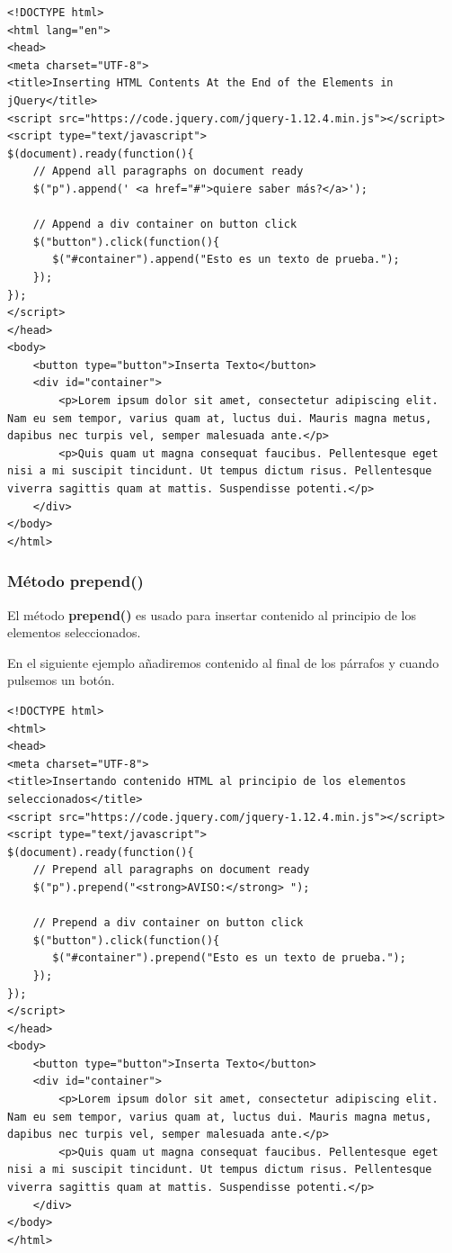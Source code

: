\documentclass[11pt]{article}
\begin{document}
\begin{verbatim}
<!DOCTYPE html>
<html lang="en">
<head>
<meta charset="UTF-8">
<title>Inserting HTML Contents At the End of the Elements in jQuery</title>
<script src="https://code.jquery.com/jquery-1.12.4.min.js"></script>
<script type="text/javascript">
$(document).ready(function(){
    // Append all paragraphs on document ready
    $("p").append(' <a href="#">quiere saber más?</a>');

    // Append a div container on button click
    $("button").click(function(){
       $("#container").append("Esto es un texto de prueba.");
    });
});
</script>
</head>
<body>
    <button type="button">Inserta Texto</button>
    <div id="container">
        <p>Lorem ipsum dolor sit amet, consectetur adipiscing elit. Nam eu sem tempor, varius quam at, luctus dui. Mauris magna metus, dapibus nec turpis vel, semper malesuada ante.</p>
        <p>Quis quam ut magna consequat faucibus. Pellentesque eget nisi a mi suscipit tincidunt. Ut tempus dictum risus. Pellentesque viverra sagittis quam at mattis. Suspendisse potenti.</p>
    </div>
</body>
</html>                                		
\end{verbatim}

\subsubsection*{Método prepend()}
\label{sec:org03af09e}

El método \textbf{prepend()} es usado para insertar contenido al principio de los elementos seleccionados.

En el siguiente ejemplo añadiremos contenido al final de los párrafos y cuando pulsemos un botón.

\begin{verbatim}
<!DOCTYPE html>
<html>
<head>
<meta charset="UTF-8">
<title>Insertando contenido HTML al principio de los elementos seleccionados</title>
<script src="https://code.jquery.com/jquery-1.12.4.min.js"></script>
<script type="text/javascript">
$(document).ready(function(){
    // Prepend all paragraphs on document ready
    $("p").prepend("<strong>AVISO:</strong> ");

    // Prepend a div container on button click
    $("button").click(function(){
       $("#container").prepend("Esto es un texto de prueba.");
    });
});
</script>
</head>
<body>
    <button type="button">Inserta Texto</button>
    <div id="container">
        <p>Lorem ipsum dolor sit amet, consectetur adipiscing elit. Nam eu sem tempor, varius quam at, luctus dui. Mauris magna metus, dapibus nec turpis vel, semper malesuada ante.</p>
        <p>Quis quam ut magna consequat faucibus. Pellentesque eget nisi a mi suscipit tincidunt. Ut tempus dictum risus. Pellentesque viverra sagittis quam at mattis. Suspendisse potenti.</p>
    </div>
</body>
</html>                                		
\end{verbatim}
\end{document}
